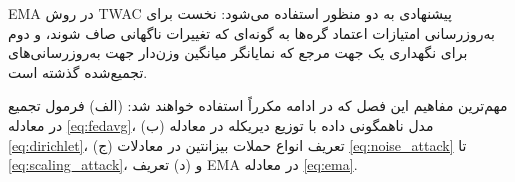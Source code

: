 \gls{EMA} در روش \gls{TWAC} پیشنهادی به دو منظور استفاده می‌شود: نخست برای به‌روزرسانی امتیازات اعتماد گره‌ها به گونه‌ای که تغییرات ناگهانی صاف شوند، و دوم برای نگهداری یک جهت مرجع که نمایانگر میانگین وزن‌دار جهت به‌روزرسانی‌های تجمیع‌شده گذشته است.

\begin{ntremember}
    مهم‌ترین مفاهیم این فصل که در ادامه مکرراً استفاده خواهند شد: (الف) فرمول تجمیع  در معادله \eqref{eq:fedavg}، (ب) مدل ناهمگونی داده با توزیع دیریکله در معادله \eqref{eq:dirichlet}، (ج) تعریف انواع حملات بیزانتین در معادلات \eqref{eq:noise_attack} تا \eqref{eq:scaling_attack}، و (د) تعریف \gls{EMA} در معادله \eqref{eq:ema}.
\end{ntremember}
